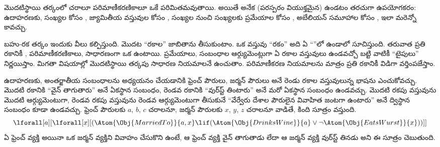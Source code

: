 \documentclass[../../../include/open-logic-section]{subfiles}
\begin{document}


మొదటిస్థాయి తర్కంలో చరాలూ పరిమాణీకరణికాలూ ఒకే
 పరిమితమవుతాయి. అయితే అనేక (పరస్పరం వియుక్తమైన)
 ఉండటం తరచుగా ఉపయోగకరం: ఉదాహరణకు, సంఖ్యల కోసం
, జ్యామితీయ వస్తువుల కోసం , సంఖ్యల నుంచి
సంఖ్యలకు ప్రమేయాల కోసం , అబేలియన్ సమూహాల కోసం
, ఇలా మరెన్నో కావచ్చు.

బహు-రక తర్కం ఇందుకు వీలు కల్పిస్తుంది. మొదట ``రకాల'' జాబితాను
తీసుకుంటాం. ఒక వస్తువు ``రకం'' అది ఏ ``''లో
ఉండాలో సూచిస్తుంది. తరువాత ప్రతి రకానికీ ,
పరిమాణీకరణికాలు, సాధారణంగా ఒక  ఉంటాయి. ప్రమేయాలు,
సంబంధాల ఆర్గ్యుమెంట్లుగా ఏ రకాల వస్తువులు ఉండవచ్చో బట్టి వాటికీ ``టైపులు''
నిర్ణయిస్తాం. మిగతా విషయాల్లో మొదటిస్థాయి తర్కపు సాధారణ నియమాలనే
ఉంచుతాం. పరిమాణీకరణ నియమాలను మాత్రం ప్రతి రకానికీ విడిగా వర్తింపజేస్తాం.

ఉదాహరణకు, అంతర్జాతీయ సంబంధాలను అధ్యయనం చేయడానికి ఫ్రెంచ్ పౌరులు,
జర్మన్ పౌరులు అనే రెండు రకాల వస్తువులున్న భాషను ఎంచుకోవచ్చు. మొదటి
రకానికి ``వైన్ తాగుతారు'' అనే ఏకస్థాన సంబంధం, రెండవ రకానికి
``వుర్‌స్ట్ తింటారు'' అనే మరో ఏకస్థాన సంబంధం ఉండవచ్చు. మొదటి రకపు వస్తువును మొదటి ఆర్గ్యుమెంటుగా, రెండవ రకపు వస్తువును రెండవ ఆర్గ్యుమెంటుగా తీసుకునే
``వేర్వేరు దేశాల పౌరులైన వివాహిత జంటగా ఉంటారు'' అనే
ద్విస్థాన సంబంధం కూడా ఉండవచ్చు. ఫ్రెంచ్ పౌరులకు $a$, $b$,
$c$ చరాలనూ, జర్మన్ పౌరులకు $x$, $y$, $z$ చరాలనూ
వాడితే, కింది సూత్రం వస్తుంది.
\[
\lforall[a][\lforall[x][(\Atom{\Obj{MarriedTo}}{a,x} \lif
(\Atom{\Obj{DrinksWine}}{a} \lor \lnot \Atom{\Obj{EatsWurst}}{x}))]]
\]
ఏ ఫ్రెంచ్ వ్యక్తి అయినా ఒక జర్మన్ వ్యక్తిని వివాహం చేసుకొని
ఉంటే, ఆ ఫ్రెంచ్ వ్యక్తి వైన్ తాగుతాడు లేదా ఆ జర్మన్ వ్యక్తి వుర్‌స్ట్
తినడు అని ఈ సూత్రం చెబుతుంది.
\end{document}
